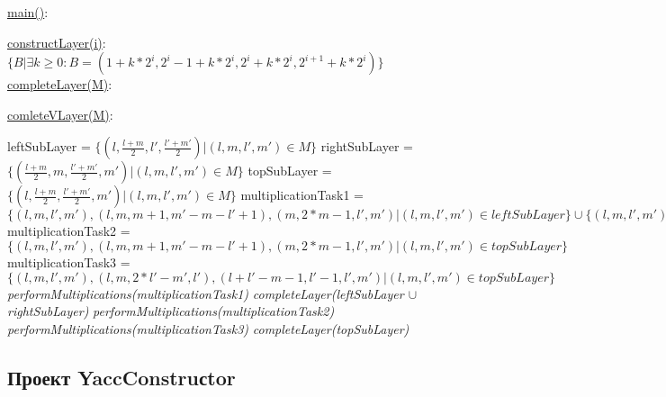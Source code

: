 \documentclass[14pt]{matmex-diploma}
\begin{document}
\begin{algorithm}[!h]
\SetAlgoNoLine
{}

\underline{main()}{:}{
 
 \BlankLine
 }
 
\underline{constructLayer(i)}{:}{
 \BlankLine
 $\{B | \exists k \geq 0 : B = (1 + k*2^i, 2^i - 1 + k*2^i, 2^i + k * 2^i, 2^{i + 1} + k * 2^i) \}$
 \BlankLine
    }
\underline{completeLayer(M)}{:}{
\BlankLine
{}
\BlankLine
}
 
\underline{comleteVLayer(M)}{:}{
 \BlankLine
 leftSubLayer = $\{ (l, \frac{l+m}{2}, l', \frac{l'+m'}{2}) | (l, m, l', m') \in M\}$\;
 rightSubLayer = $\{ (\frac{l+m}{2}, m, \frac{l'+m'}{2}, m') | (l, m, l', m') \in M\}$\;
 topSubLayer = $\{ (l, \frac{l+m}{2}, \frac{l'+m'}{2}, m') | (l, m, l', m') \in M\}$\;
 multiplicationTask1 = $\{(l, m, l', m'), (l, m, m + 1, m' - m - l' + 1), (m, 2*m - 1, l', m') | (l, m, l', m') \in leftSubLayer\} \cup  \{(l, m, l', m'), (l, m, 2*l' - m', l'), (l + l' - m - 1, l' - 1, l', m') | (l, m, l', m') \in rightSubLayer\}$\;
 \BlankLine
 multiplicationTask2 = $\{(l, m, l', m'), (l, m, m + 1, m' - m - l' + 1), (m, 2*m - 1, l', m') | (l, m, l', m') \in topSubLayer\}$\;
 \BlankLine 
 multiplicationTask3 = $\{(l, m, l', m'), (l, m, 2*l' - m', l'), (l + l' - m - 1, l' - 1, l', m') | (l, m, l', m') \in topSubLayer\}$\;
 \BlankLine
 \textit{performMultiplications(multiplicationTask1)}\;
 \textit{completeLayer(leftSubLayer $\cup$ rightSubLayer)}\;
 \textit{performMultiplications(multiplicationTask2)}\;
 \textit{performMultiplications(multiplicationTask3)}\;
 \textit{completeLayer(topSubLayer)}
 

 }
 
\caption{Модифицированный алгоритм}
\end{algorithm}



\subsection{Проект YaccConstruсtor}
\end{document}
